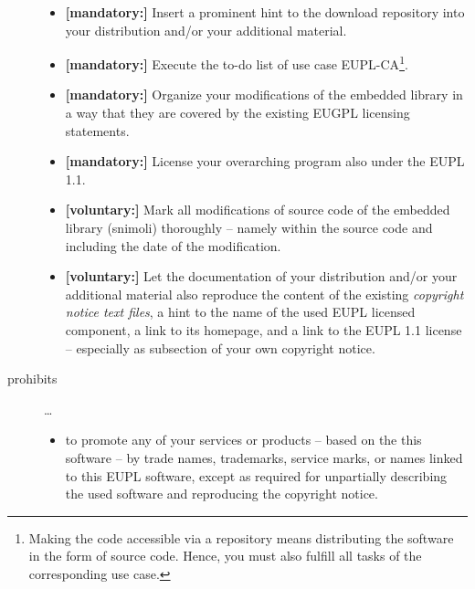 \begin{description}
\begin{itemize}
  \item \textbf{[mandatory:]} Insert a prominent hint to the download repository
  into your distribution and/or your additional material.
  
  \item \textbf{[mandatory:]} Execute the to-do list of use case EUPL-CA\footnote{
  Making the code accessible via a repository means distributing the software in
  the form of source code. Hence, you must also fulfill all tasks of the
  corresponding use case.}.
  
  \item \textbf{[mandatory:]} Organize your modifications of the embedded
  library in a way that they are covered by the existing EUGPL licensing
  statements. 
  
  \item \textbf{[mandatory:]} License your overarching program also under the
  EUPL 1.1.
  
  \item \textbf{[voluntary:]} Mark all modifications of source code of the
  embedded library (snimoli) thoroughly -- namely within the source code and
  including the date of the modification.

  \item \textbf{[voluntary:]} Let the documentation of your distribution and/or
  your additional material  also reproduce the content of the existing
  \emph{copyright notice text files}, a hint to the name of the used EUPL
  licensed component, a link to its homepage, and a link to the EUPL 1.1 license
  -- especially as subsection of your own copyright notice.
  
\end{itemize}

\item[prohibits] \ldots
\begin{itemize}
  \item to promote any of your services or products -- based on the this software
  -- by trade names, trademarks, service marks, or names linked to this EUPL
  software, except as required for unpartially describing the used software and
  reproducing the copyright notice.
\end{itemize}

\end{description}

